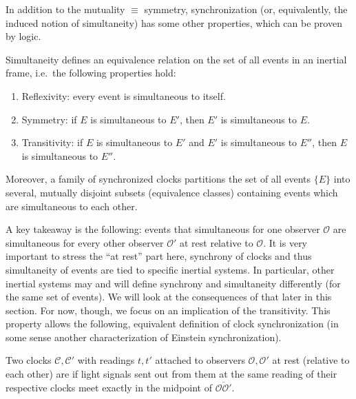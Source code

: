 In addition to the mutuality $\equiv$ symmetry, synchronization (or, equivalently, the induced notion of simultaneity) has some other properties, which can be proven by logic.
\begin{prop}\label{prop:simult_equiv_relation}
	Simultaneity defines an equivalence relation on the set of all events in an inertial frame, i.e.~the following properties hold:
	\begin{enumerate}
		\item Reflexivity: every event is simultaneous to itself.
		
		\item Symmetry: if $E$ is simultaneous to $E'$, then $E'$ is simultaneous to $E$.
		
		\item Transitivity: if $E$ is simultaneous to $E'$ and $E'$ is simultaneous to $E''$, then $E$ is simultaneous to $E''$.
	\end{enumerate}
	
	Moreover, a family of synchronized clocks partitions the set of all events $\{E\}$ into several, mutually disjoint subsets (equivalence classes) containing events which are simultaneous to each other.
\end{prop}
A key takeaway is the following: events that simultaneous for one observer $\mathcal{O}$ are simultaneous for every other observer $\mathcal{O}'$ at rest relative to $\mathcal{O}$. It is very important to stress the \enquote{at rest} part here, synchrony of clocks and thus simultaneity of events are tied to specific inertial systems. In particular, other inertial systems may and will define synchrony and simultaneity differently (for the same set of events). We will look at the consequences of that later in this section. For now, though, we focus on an implication of the transitivity. This property allows the following, equivalent definition of clock synchronization (in some sense another characterization of Einstein synchronization).
\begin{defi}\label{defi:synchrony_2}
	Two clocks $\mathcal{C}, \mathcal{C}'$ with readings $t, t'$ attached to observers $\mathcal{O}, \mathcal{O}'$ at rest (relative to each other) are  if light signals sent out from them at the same reading of their respective clocks meet exactly in the midpoint of $\overline{\mathcal{O} \mathcal{O}'}$.
\end{defi}
